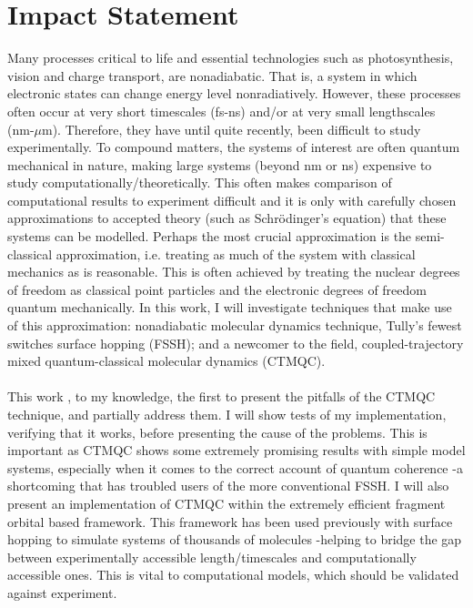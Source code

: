 \chapter*{Impact Statement}
Many processes critical to life and essential technologies such as photosynthesis, vision and charge transport, are nonadiabatic. That is, a system in which electronic states can change energy level nonradiatively. However, these processes often occur at very short timescales (fs-ns) and/or at very small lengthscales (nm-$\mu$m). Therefore, they have until quite recently, been difficult to study experimentally. To compound matters, the systems of interest are often quantum mechanical in nature, making large systems (beyond nm or ns) expensive to study computationally/theoretically. This often makes comparison of computational results to experiment difficult and it is only with carefully chosen approximations to accepted theory (such as Schr\"odinger's equation) that these systems can be modelled. Perhaps the most crucial approximation is the semi-classical approximation, i.e. treating as much of the system with classical mechanics as is reasonable. This is often achieved by treating the nuclear degrees of freedom as classical point particles and the electronic degrees of freedom quantum mechanically. In this work, I will investigate 
 techniques that make use of this approximation:  nonadiabatic molecular dynamics technique, Tully's fewest switches surface hopping (FSSH); and a  newcomer to the field, coupled-trajectory mixed quantum-classical molecular dynamics (CTMQC).
\\\\
This work , to my knowledge, the first to present the pitfalls of the CTMQC technique, and partially address them. I will show tests of my implementation, verifying that it works, before presenting the cause of the problems. This is important as CTMQC shows some extremely promising results with simple model systems, especially when it comes to the correct account of quantum coherence -a shortcoming that has troubled users of the more conventional FSSH. I will also present an implementation of CTMQC within the extremely efficient fragment orbital based framework. This framework has been used previously with surface hopping to simulate systems of thousands of molecules -helping to bridge the gap between experimentally accessible length/timescales and computationally accessible ones. This is vital to computational models, which should be validated against experiment.
